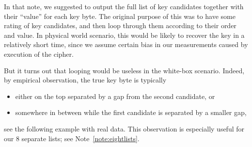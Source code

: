 	In that note, we suggested to output the full list of key candidates together with their ``value'' for each key byte. The original purpose of this was to have some rating of key candidates, and then loop through them according to their order and value. In physical world scenario, this would be likely to recover the key in a relatively short time, since we assume certain bias in our measurements caused by execution of the cipher.
	
	But it turns out that looping would be useless in the white-box scenario. Indeed, by empirical observation, the true key byte is typically
	\begin{itemize}
		\item either on the top separated by a gap from the second candidate, or
		\item somewhere in between while the first candidate is separated by a smaller gap,
	\end{itemize}
	see the following example with real data. This observation is especially useful for our $8$ separate lists; see Note~\ref{note:eightlists}.
	
